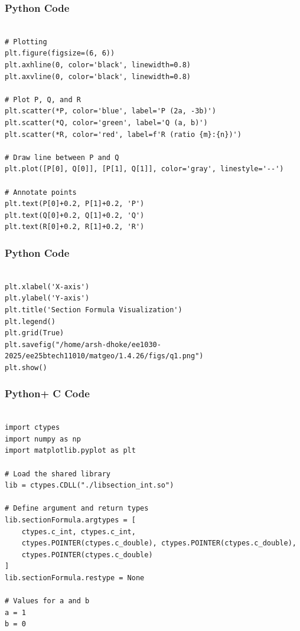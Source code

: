 \documentclass{beamer}
\begin{document}
\begin{frame}[fragile]
    \frametitle{Python Code}

    \begin{lstlisting}

# Plotting
plt.figure(figsize=(6, 6))
plt.axhline(0, color='black', linewidth=0.8)
plt.axvline(0, color='black', linewidth=0.8)

# Plot P, Q, and R
plt.scatter(*P, color='blue', label='P (2a, -3b)')
plt.scatter(*Q, color='green', label='Q (a, b)')
plt.scatter(*R, color='red', label=f'R (ratio {m}:{n})')

# Draw line between P and Q
plt.plot([P[0], Q[0]], [P[1], Q[1]], color='gray', linestyle='--')

# Annotate points
plt.text(P[0]+0.2, P[1]+0.2, 'P')
plt.text(Q[0]+0.2, Q[1]+0.2, 'Q')
plt.text(R[0]+0.2, R[1]+0.2, 'R')

\end{lstlisting}
\end{frame}


\begin{frame}[fragile]
    \frametitle{Python Code}

    \begin{lstlisting}

plt.xlabel('X-axis')
plt.ylabel('Y-axis')
plt.title('Section Formula Visualization')
plt.legend()
plt.grid(True)
plt.savefig("/home/arsh-dhoke/ee1030-2025/ee25btech11010/matgeo/1.4.26/figs/q1.png")
plt.show()

    \end{lstlisting}
\end{frame}

\begin{frame}[fragile]
    \frametitle{Python+ C Code}

    \begin{lstlisting}

import ctypes
import numpy as np
import matplotlib.pyplot as plt

# Load the shared library
lib = ctypes.CDLL("./libsection_int.so")

# Define argument and return types
lib.sectionFormula.argtypes = [
    ctypes.c_int, ctypes.c_int,
    ctypes.POINTER(ctypes.c_double), ctypes.POINTER(ctypes.c_double),
    ctypes.POINTER(ctypes.c_double)
]
lib.sectionFormula.restype = None

# Values for a and b
a = 1
b = 0


    \end{lstlisting}
\end{frame}
\end{document}
